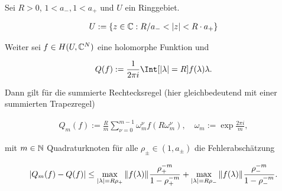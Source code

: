 \begin{lemma} \label{lem:quadratur_konvergenz}

    Sei $R > 0$, $1 < a_-, 1 < a_+$ und $U$ ein Ringgebiet.

    \begin{align*}
        U := {\left \{ z \in \mathbb{C}: R / a_- < {\left | z \right |} < R \cdot a_+ \right \}}
    \end{align*}

    Weiter sei $f \in H(U, \mathbb{C}^N)$ eine holomorphe Funktion und

    \begin{align*}
        Q(f)
        :=
        \frac{1}{2 \pi i}
        \Int[\abs{\lambda} = R]{f(\lambda)}{\lambda}.
    \end{align*}

    Dann gilt für die summierte Rechtecksregel (hier gleichbedeutend mit einer summierten Trapezregel)

    \begin{align*}
        Q_m(f)
        :=
        \frac{R}{m}
        \sum_{\nu = 0}^{m - 1}
            \omega_m^\nu
            f(R \omega_m^\nu),
        \quad
        \omega_m
        :=
        \exp \frac{2 \pi i}{m},
    \end{align*}

    mit $m \in \mathbb{N}$ Quadraturknoten für alle $\rho_\pm \in (1, a_\pm)$ die Fehlerabschätzung

    \begin{align*}
        {\left | Q_m(f) - Q(f) \right |}
        \leq
        \max_{{\left | \lambda \right |} = R \rho_+}
            {\left \| f(\lambda) \right \|}_{}
        \frac{\rho_+^{-m}}{1 - \rho_+^{-m}}
        +
        \max_{{\left | \lambda \right |} = R \rho_-}
            {\left \| f(\lambda) \right \|}_{}
        \frac{\rho_-^{-m}}{1 - \rho_-^{-m}}.
    \end{align*}

\end{lemma}
